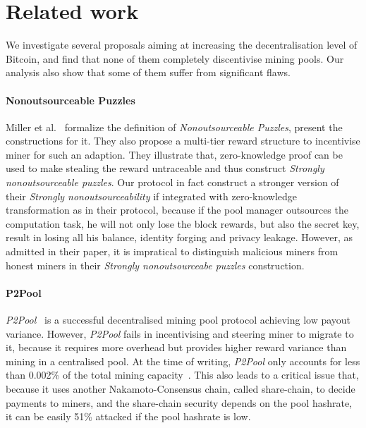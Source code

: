 \section{Related work}

We investigate several proposals aiming at increasing the decentralisation level of Bitcoin, and find that none of them completely discentivise mining pools.
Our analysis also show that some of them suffer from significant flaws.


\paragraph{\textbf{Nonoutsourceable Puzzles}}
Miller et al.~\cite{miller2015nonoutsourceable} formalize the definition of \textit{Nonoutsourceable Puzzles},
present the constructions for it.
They also propose a multi-tier reward structure to incentivise miner for such an adaption.  
They illustrate that, zero-knowledge proof can be used to make stealing the reward untraceable and thus construct \textit{Strongly nonoutsourceable puzzles}.
Our protocol in fact construct a stronger version of their \textit{Strongly nonoutsourceability} if integrated with zero-knowledge transformation as in their protocol, because if the pool manager outsources the computation task, he will not only lose the block rewards, but also the secret key, result in losing all his balance, identity forging and privacy leakage.
However, as admitted in their paper, it is impratical to distinguish malicious miners from honest miners in their \textit{Strongly nonoutsourceabe puzzles} construction.


\paragraph{\textbf{P2Pool}}
\textit{P2Pool}~\cite{p2pool} is a successful decentralised mining pool protocol achieving low payout variance.
However, \textit{P2Pool} fails in incentivising and steering miner to migrate to it, because it requires more overhead but provides higher reward variance than mining in a centralised pool.
At the time of writing, \textit{P2Pool} only accounts for less than 0.002\% of the total mining capacity~\cite{p2pool-stats}.
This also leads to a critical issue that, because it uses another Nakamoto-Consensus chain, called share-chain, to decide payments to miners, and the share-chain security depends on the pool hashrate, it can be easily 51\% attacked if the pool hashrate is low.


